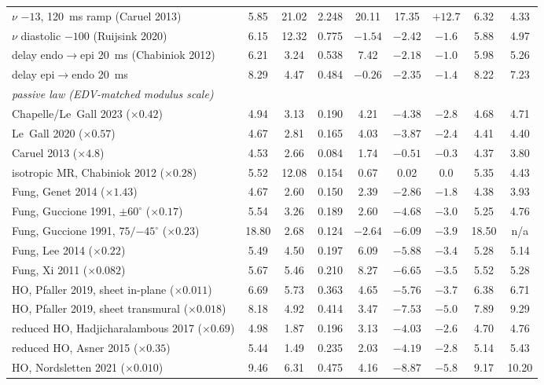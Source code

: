 \documentclass[10pt]{article}
\begin{document}
\begin{center}
\begin{longtable}{lcccccccc}
$\nu$ $-13$, \SI{120}{ms} ramp (Caruel 2013) & 5.85 & 21.02 & 2.248 & 20.11 & 17.35 & $+12.7$ & 6.32 & 4.33 \\
$\nu$ diastolic $-100$ (Ruijsink 2020) & 6.15 & 12.32 & 0.775 & $-1.54$ & $-2.42$ & $-1.6$ & 5.88 & 4.97 \\
delay endo$\to$epi \SI{20}{ms} (Chabiniok 2012) & 6.21 & 3.24 & 0.538 & 7.42 & $-2.18$ & $-1.0$ & 5.98 & 5.26 \\
delay epi$\to$endo \SI{20}{ms} & 8.29 & 4.47 & 0.484 & $-0.26$ & $-2.35$ & $-1.4$ & 8.22 & 7.23 \\ \midrule
\multicolumn{9}{l}{\emph{passive law (EDV-matched modulus scale)}} \\
Chapelle/Le~Gall 2023 ($\times0.42$) & 4.94 & 3.13 & 0.190 & 4.21 & $-4.38$ & $-2.8$ & 4.68 & 4.71 \\
Le~Gall 2020 ($\times0.57$) & 4.67 & 2.81 & 0.165 & 4.03 & $-3.87$ & $-2.4$ & 4.41 & 4.40 \\
Caruel 2013 ($\times4.8$) & 4.53 & 2.66 & 0.084 & 1.74 & $-0.51$ & $-0.3$ & 4.37 & 3.80 \\
isotropic MR, Chabiniok 2012 ($\times0.28$) & 5.52 & 12.08 & 0.154 & 0.67 & 0.02 & $0.0$ & 5.35 & 4.43 \\
Fung, Genet 2014 ($\times1.43$) & 4.67 & 2.60 & 0.150 & 2.39 & $-2.86$ & $-1.8$ & 4.38 & 3.93 \\
Fung, Guccione 1991, $\pm60^\circ$ ($\times0.17$) & 5.54 & 3.26 & 0.189 & 2.60 & $-4.68$ & $-3.0$ & 5.25 & 4.76 \\
Fung, Guccione 1991, $75/{-45}^\circ$ ($\times0.23$) & 18.80 & 2.68 & 0.124 & $-2.64$ & $-6.09$ & $-3.9$ & 18.50 & n/a \\
Fung, Lee 2014 ($\times0.22$) & 5.49 & 4.50 & 0.197 & 6.09 & $-5.88$ & $-3.4$ & 5.28 & 5.14 \\
Fung, Xi 2011 ($\times0.082$) & 5.67 & 5.46 & 0.210 & 8.27 & $-6.65$ & $-3.5$ & 5.52 & 5.28 \\
HO, Pfaller 2019, sheet in-plane ($\times0.011$) & 6.69 & 5.73 & 0.363 & 4.65 & $-5.76$ & $-3.7$ & 6.38 & 6.71 \\
HO, Pfaller 2019, sheet transmural ($\times0.018$) & 8.18 & 4.92 & 0.414 & 3.47 & $-7.53$ & $-5.0$ & 7.89 & 9.29 \\
reduced HO, Hadjicharalambous 2017 ($\times0.69$) & 4.98 & 1.87 & 0.196 & 3.13 & $-4.03$ & $-2.6$ & 4.70 & 4.76 \\
reduced HO, Asner 2015 ($\times0.35$) & 5.44 & 1.49 & 0.235 & 2.03 & $-4.19$ & $-2.8$ & 5.14 & 5.43 \\
HO, Nordsletten 2021 ($\times0.010$) & 9.46 & 6.31 & 0.475 & 4.16 & $-8.87$ & $-5.8$ & 9.17 & 10.20 \\ \midrule

\end{longtable}
\end{center}
\end{document}
